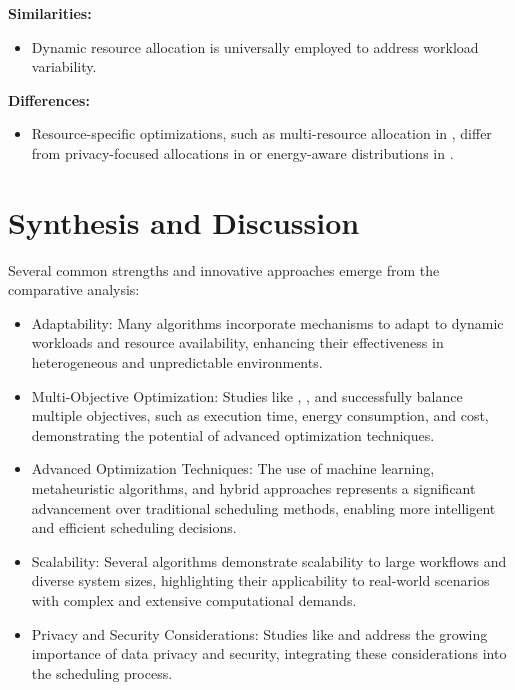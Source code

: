 \documentclass[a4paper, final]{article}
\begin{document}
\noindent \textbf{Similarities:}
\begin{itemize}
    \item Dynamic resource allocation is universally employed to address workload variability.
\end{itemize}

\noindent \textbf{Differences:}
\begin{itemize}
    \item Resource-specific optimizations, such as multi-resource allocation in \cite{bib:8}, differ 
    from privacy-focused allocations in \cite{bib:7_ppps} or energy-aware distributions in \cite{bib:5_epee}.
\end{itemize}

\section{Synthesis and Discussion}
Several common strengths and innovative approaches emerge from the comparative analysis:
\begin{itemize}
    \item Adaptability: Many algorithms incorporate mechanisms to adapt to dynamic workloads and resource availability, 
    enhancing their effectiveness in heterogeneous and unpredictable environments.

    \item Multi-Objective Optimization: Studies like \cite{bib:6_marine}, \cite{bib:3_sandcat}, and \cite{bib:10} successfully balance multiple objectives, such 
    as execution time, energy consumption, and cost, demonstrating the potential of advanced optimization techniques.
    
    \item Advanced Optimization Techniques: The use of machine learning, metaheuristic algorithms, and hybrid approaches 
    represents a significant advancement over traditional scheduling methods, enabling more intelligent and efficient 
    scheduling decisions.
    
    \item Scalability: Several algorithms demonstrate scalability to large workflows and diverse system sizes, highlighting 
    their applicability to real-world scenarios with complex and extensive computational demands.
    
    \item Privacy and Security Considerations: Studies like \cite{bib:2_faro} and \cite{bib:7_ppps} address the growing importance of data privacy and 
    security, integrating these considerations into the scheduling process.
\end{itemize}
\end{document}
